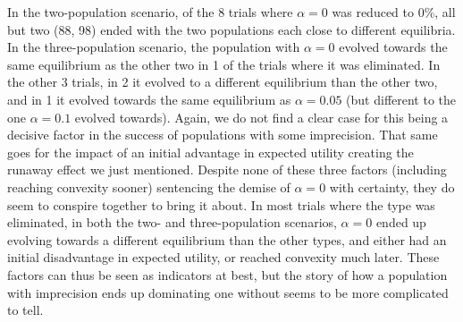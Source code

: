 \documentclass[a4paper]{article}
\begin{document}
In the two-population scenario, of the 8 trials where $\alpha = 0$ was reduced to 0\%, all but two (88, 98) ended with the two populations each close to different equilibria.
In the three-population scenario, the population with $\alpha = 0$ evolved towards the same equilibrium as the other two in 1 of the trials where it was eliminated.
In the other 3 trials, in 2 it evolved to a different equilibrium than the other two, and in 1 it evolved towards the same equilibrium as $\alpha = 0.05$ (but different to the one $\alpha = 0.1$ evolved towards).
Again, we do not find a clear case for this being a decisive factor in the success of populations with some imprecision.
That same goes for the impact of an initial advantage in expected utility creating the runaway effect we just mentioned.
Despite none of these three factors (including reaching convexity sooner) sentencing the demise of $\alpha = 0$ with certainty, they do seem to conspire together to bring it about.
In most trials where the type was eliminated, in both the two- and three-population scenarios, $\alpha = 0$ ended up evolving towards a different equilibrium than the other types, and either had an initial disadvantage in expected utility, or reached convexity much later.
These factors can thus be seen as indicators at best, but the story of how a population with imprecision ends up dominating one without seems to be more complicated to tell.
\end{document}
